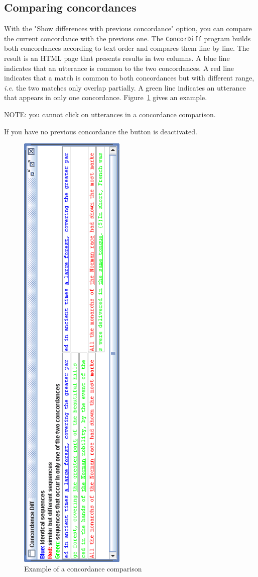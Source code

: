 \subsection{Comparing concordances}
\label{section-comparing-concordances}
With the "Show differences with previous concordance" option, you can compare the
current concordance with the previous one. The \verb+ConcorDiff+ program builds
both concordances according to text order and compares them line by line. The
result is an HTML page that presents results in two columns. A blue line
indicates that an utterance is common to the two concordances. A red line
indicates that a match is common to both concordances but with different range,
\textit{i.e.} the two matches only overlap partially. A green line indicates an
utterance that appears in only one concordance. Figure~\ref{fig-concordiff} gives an
example.

\bigskip
\noindent NOTE: you cannot click on utterances in a concordance comparison.

\bigskip
\noindent If you have no previous concordance the button is deactivated.

\bigskip
\begin{figure}[h]
\begin{center}
\includegraphics[height=22cm]{resources/img/fig6-33.png}
\caption{Example of a concordance comparison\label{fig-concordiff}}
\end{center}
\end{figure}


